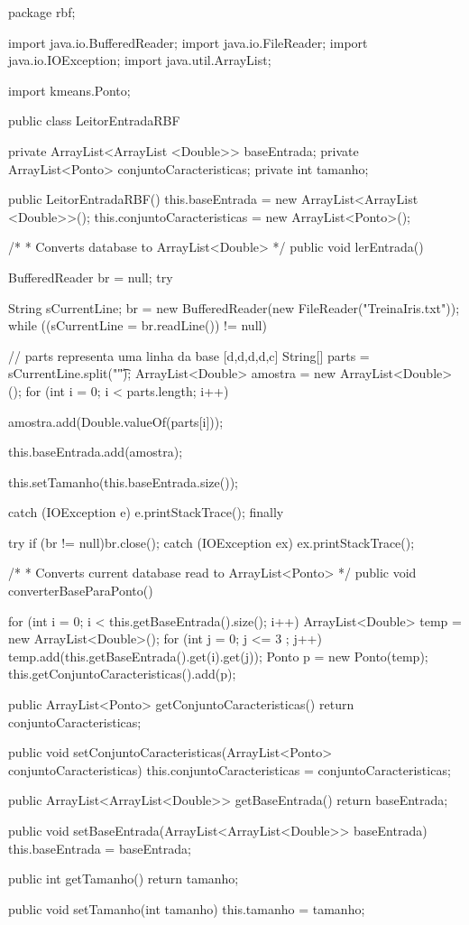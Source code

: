 \documentclass[10pt,twocolumn,letterpaper]{article}
\begin{document}
\begin{spverbatim}
package rbf;

import java.io.BufferedReader;
import java.io.FileReader;
import java.io.IOException;
import java.util.ArrayList;

import kmeans.Ponto;

public class LeitorEntradaRBF {
	private ArrayList<ArrayList <Double>> baseEntrada;
	private ArrayList<Ponto> conjuntoCaracteristicas;
	private int tamanho;
	
	public LeitorEntradaRBF(){
		this.baseEntrada = new ArrayList<ArrayList <Double>>();
		this.conjuntoCaracteristicas = new ArrayList<Ponto>();
	}
	
	/*
	 * Converts database to ArrayList<Double>
	 */
	public void lerEntrada(){
		BufferedReader br = null;
		try {
			String sCurrentLine;
			br = new BufferedReader(new FileReader("TreinaIris.txt"));
			while ((sCurrentLine = br.readLine()) != null) {
				// parts representa uma linha da base [d,d,d,d,c]
				String[] parts = sCurrentLine.split("\t");
				ArrayList<Double> amostra = new ArrayList<Double>();
				for (int i = 0; i < parts.length; i++) {							
					amostra.add(Double.valueOf(parts[i]));	
					
				}
				this.baseEntrada.add(amostra);	
			}
			this.setTamanho(this.baseEntrada.size());

		} catch (IOException e) {
			e.printStackTrace();
		} finally {
			try {
				if (br != null)br.close();
			} catch (IOException ex) {
				ex.printStackTrace();
	}

}
	}
	
	/*
	 * Converts current database read to ArrayList<Ponto>
	 */
	public void converterBaseParaPonto(){
		for (int i = 0; i < this.getBaseEntrada().size(); i++) {
			ArrayList<Double> temp = new ArrayList<Double>();
			for (int j = 0; j <= 3 ; j++) {
				temp.add(this.getBaseEntrada().get(i).get(j));
			}
			Ponto p = new Ponto(temp);
			this.getConjuntoCaracteristicas().add(p);
		}
		
	}
	
	public ArrayList<Ponto> getConjuntoCaracteristicas() {
		return conjuntoCaracteristicas;
	}

	public void setConjuntoCaracteristicas(ArrayList<Ponto> conjuntoCaracteristicas) {
		this.conjuntoCaracteristicas = conjuntoCaracteristicas;
	}

	public ArrayList<ArrayList<Double>> getBaseEntrada() {
		return baseEntrada;
	}


	public void setBaseEntrada(ArrayList<ArrayList<Double>> baseEntrada) {
		this.baseEntrada = baseEntrada;
	}


	public int getTamanho() {
		return tamanho;
	}

	public void setTamanho(int tamanho) {
		this.tamanho = tamanho;
	}
}
\end{spverbatim}
\end{document}
